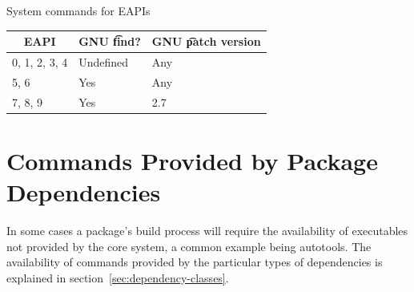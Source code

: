 \begin{centertable}{System commands for EAPIs}
    \label{tab:system-commands-table}
    \begin{tabular}{lll}
      \toprule
      \multicolumn{1}{c}{\textbf{EAPI}} &
      \multicolumn{1}{c}{\textbf{GNU \t{find}?}} &
      \multicolumn{1}{c}{\textbf{GNU \t{patch} version}} \\
      \midrule
      0, 1, 2, 3, 4     & Undefined & Any \\
      5, 6              & Yes       & Any \\
      7, 8, 9           & Yes       & 2.7 \\
      \bottomrule
    \end{tabular}
\end{centertable}

\section{Commands Provided by Package Dependencies}

In some cases a package's build process will require the availability of executables not provided by
the core system, a common example being autotools. The availability of commands provided by the
particular types of dependencies is explained in section~\ref{sec:dependency-classes}.




